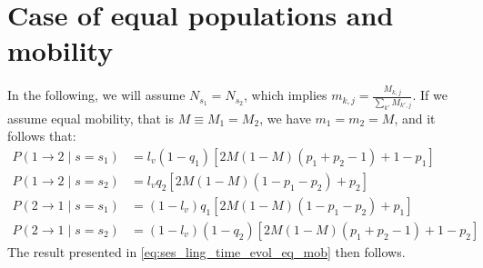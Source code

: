 \documentclass[../thesis.tex]{subfiles}
\begin{document}


\section*{Case of equal populations and mobility}
In the following, we will assume $N_{s_1} = N_{s_2}$, which implies $m_{k, j} =
\frac{M_{k, j}}{\sum_{k'} M_{k', j}}$. If we assume equal mobility, that is $M \equiv
M_1 = M_2$, we have $m_1 = m_2 = M$, and it follows that:
\begin{equation}
    \begin{aligned}
        P(1 \rightarrow 2 \mid s = s_1)
            &= l_v (1 - q_1)
            \left[
                2 M (1 - M) (p_1 + p_2 - 1) + 1 - p_1
            \right]
        \\
        P(1 \rightarrow 2 \mid s = s_2)
            &= l_v q_2
            \left[
                2 M (1 - M) (1 - p_1 - p_2) + p_2
            \right]
        \\
        P(2 \rightarrow 1 \mid s = s_1)
            &= (1 - l_v) q_1
            \left[
                2 M (1 - M) (1 - p_1 - p_2) + p_1
            \right]
        \\
        P(2 \rightarrow 1 \mid s = s_2)
            &= (1 - l_v) (1 - q_2)
            \left[
                2 M (1 - M) (p_1 + p_2 - 1) + 1 - p_2
            \right]
    \end{aligned}
\end{equation}
The result presented in \cref{eq:ses_ling_time_evol_eq_mob} then follows.
\end{document}
